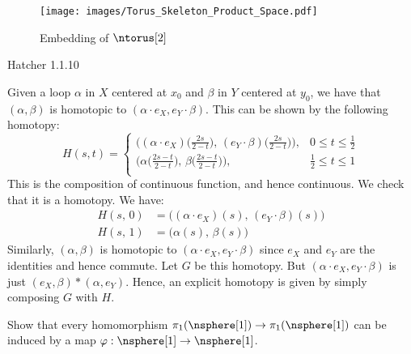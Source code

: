 \documentclass{book}                                                           %
\begin{document}
\begin{figure}[H]
    \centering
    \captionsetup{type=figure}
    \texttt{[image: images/Torus\_Skeleton\_Product\_Space.pdf]}
    \caption{Embedding of $\ntorus[2]$}
    \label{fig:Embedding_of_Torus}
\end{figure}
\begin{problem}
    Hatcher 1.1.10
\end{problem}
\begin{solution}
    Given a loop $\alpha$ in $X$ centered at $x_{0}$ and $\beta$ in $Y$
    centered at $y_{0}$, we have that $(\alpha,\beta)$ is homotopic to
    $(\alpha\cdot{e}_{X},e_{Y}\cdot\beta)$. This can be shown by the
    following homotopy:
    \begin{equation}
        H(s,t)=
        \begin{cases}
            \big(%
                (\alpha\cdot{e}_{X})\Big(\frac{2s}{2-t}\Big),\,
                (e_{Y}\cdot\beta)\Big(\frac{2s}{2-t}\Big)
            \big),
            &0\leq{t}\leq\frac{1}{2}\\[2ex]
            \big(%
                \alpha\Big(\frac{2s-t}{2-t}\Big),\,
                \beta\Big(\frac{2s-t}{2-t}\Big)
            \big),
            &\frac{1}{2}\leq{t}\leq{1}\\
        \end{cases}
    \end{equation}
    This is the composition of continuous function, and hence continuous. We
    check that it is a homotopy. We have:
    \begin{subequations}
        \begin{align}
            H(s,\,0)&=\big(
                (\alpha\cdot{e}_{X})(s),\,(e_{Y}\cdot\beta)(s)
            \big)\\
            H(s,\,1)&=\big(\alpha(s),\,\beta(s)\big)
        \end{align}
    \end{subequations}
    Similarly, $(\alpha,\beta)$ is homotopic to
    $(\alpha\cdot{e}_{X},e_{Y}\cdot\beta)$ since $e_{X}$ and $e_{Y}$ are
    the identities and hence commute. Let $G$ be this homotopy.
    But $(\alpha\cdot{e}_{X},e_{Y}\cdot\beta)$ is just
    $(e_{X},\beta)*(\alpha,e_{Y})$. Hence, an explicit homotopy is given by
    simply composing $G$ with $H$.
\end{solution}
\begin{problem}
    Show that every homomorphism
    $\pi_{1}(\nsphere[1])\rightarrow\pi_{1}(\nsphere[1])$ can be induced by
    a map $\varphi:\nsphere[1]\rightarrow\nsphere[1]$.
\end{problem}
\end{document}
